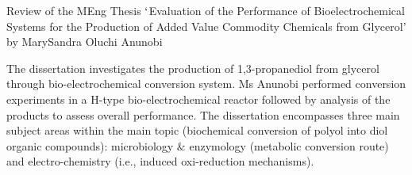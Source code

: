\documentclass[14pt,twoside]{report}
\begin{document}
\vfill


\clearpage


\bigskip

\begin{center}
  {\Large Review of the MEng Thesis $\lq$Evaluation of the Performance of Bioelectrochemical Systems for the Production of Added Value Commodity Chemicals from Glycerol' by MarySandra Oluchi Anunobi }
\end{center}

\medskip

The dissertation investigates the production of 1,3-propanediol from glycerol through bio-electrochemical conversion system.  Ms Anunobi performed conversion experiments in a H-type bio-electrochemical reactor followed by analysis of the products to assess overall performance. The dissertation encompasses three main subject areas within the main topic (biochemical conversion of polyol into diol organic compounds): microbiology $\&$ enzymology (metabolic conversion route) and electro-chemistry (i.e., induced oxi-reduction mechanisms). 
\end{document}
